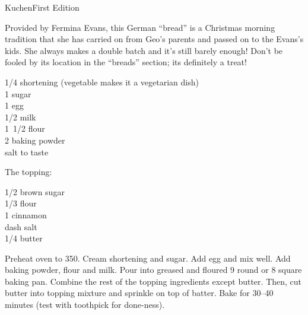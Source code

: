\begin{entry}{Kuchen}{First Edition}

\begin{open}
  Provided by Fermina Evans, this German ``bread'' is a Christmas morning tradition that she has carried on from Geo's parents and passed on to the Evans's kids. She always makes a double batch and it's still barely enough!
  Don't be fooled by its location in the ``breads'' section; its definitely a
  treat!
\end{open}
\begin{ingredients}
  \SI{1/4}{\cup} shortening (vegetable makes it a vegetarian dish)\\
  \SI{1}{\cup} sugar \\
  1 egg \\
  \SI{1/2}{\cup} milk \\
  \SI{1/2}[1]{\cup} flour \\
  \SI{2}{\teaspoon} baking powder \\
  salt to taste
\end{ingredients}
The topping:
\begin{ingredients}
  \SI{1/2}{\cup} brown sugar \\
  \SI{1/3}{\cup} flour \\
  \SI{1}{\teaspoon} cinnamon \\
  dash salt\\
  \SI{1/4}{\cup} butter
\end{ingredients}
Preheat oven to \SI{350}{\degreeF}. Cream shortening and sugar. Add egg and mix
well.  Add baking powder, flour and milk. Pour into greased and floured
\SI{9}{\inch} round or \SI{8}{\inch} square baking pan. Combine the rest of
the topping ingredients except butter. Then, cut butter into topping mixture
and sprinkle on top of batter. Bake for \numrange{30}{40} minutes (test with
toothpick for done-ness).
\end{entry}

